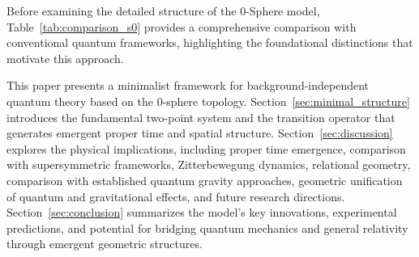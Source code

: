 \documentclass[%
 reprint,
 amsmath,amssymb,
 aps,
]{revtex4-1}
\numberwithin{equation}{section}%
\begin{document}
Before examining the detailed structure of the 0-Sphere model, Table~\ref{tab:comparison_s0} provides a comprehensive comparison with conventional quantum frameworks, highlighting the foundational distinctions that motivate this approach.

This paper presents a minimalist framework for background-independent quantum theory based on the 0-sphere topology. Section~\ref{sec:minimal_structure} introduces the fundamental two-point system and the transition operator that generates emergent proper time and spatial structure. Section~\ref{sec:discussion} explores the physical implications, including proper time emergence, comparison with supersymmetric frameworks, Zitterbewegung dynamics, relational geometry, comparison with established quantum gravity approaches, geometric unification of quantum and gravitational effects, and future research directions. Section~\ref{sec:conclusion} summarizes the model's key innovations, experimental predictions, and potential for bridging quantum mechanics and general relativity through emergent geometric structures.
\end{document}
